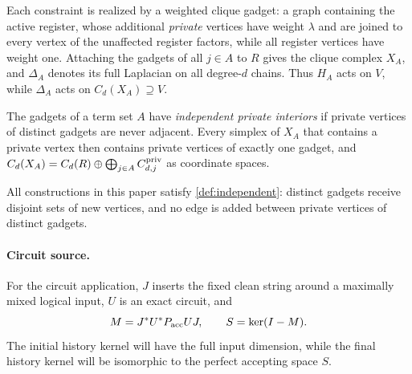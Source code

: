 Each constraint is realized by a weighted clique gadget: a graph containing
the active register, whose additional \emph{private} vertices have weight
\(\lambda\) and are joined to every vertex of the unaffected register
factors, while all register vertices have weight one.  Attaching the gadgets
of all \(j\in A\) to \(R\) gives the clique complex \(X_A\), and \(\Delta_A\)
denotes its full Laplacian on all degree-\(d\) chains.  Thus \(H_A\) acts on
\(V\), while \(\Delta_A\) acts on \(C_d(X_A)\supseteq V\).

\begin{definition}
\label{def:independent}
The gadgets of a term set \(A\) have \emph{independent private interiors}
if private vertices of distinct gadgets are never adjacent.  Every simplex
of \(X_A\) that contains a private vertex then contains private vertices of
exactly one gadget, and
\(C_d(X_A)=C_d(R)\oplus\bigoplus_{j\in A}C^{\rm priv}_{d,j}\) as coordinate
spaces.
\end{definition}
All constructions in this paper satisfy \cref{def:independent}: distinct
gadgets receive disjoint sets of new vertices, and no edge is added between
private vertices of distinct gadgets.

\paragraph{Circuit source.}
For the circuit application, \(J\) inserts the fixed clean string around a
maximally mixed logical input, \(U\) is an exact circuit, and
\[
M=J^*U^*P_{\rm acc}UJ,\qquad S=\ker(I-M).
\]
The initial history kernel will have the full input dimension, while the
final history kernel will be isomorphic to the perfect accepting space
\(S\).
